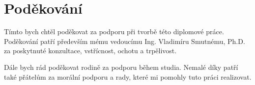 \null 
\section*{Poděkování}

Tímto bych chtěl poděkovat za podporu při tvorbě této diplomové práce. Po\-dě\-ko\-vá\-ní patří především mému vedoucímu Ing. Vladimíru Smutnému, Ph.D. za poskytnuté konzultace, vstřícnost, ochotu a trpělivost. 

Dále bych rád poděkovat rodině za podporu během studia. Nemalé díky patří také přátelům za morální podporu a rady, které mi pomohly tuto práci realizovat.   

\vfill{}